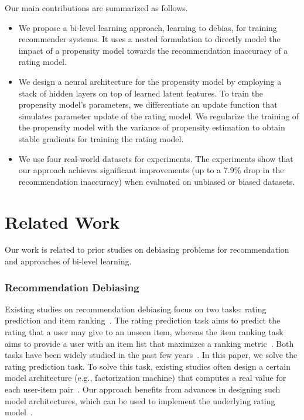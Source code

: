 \documentclass[letterpaper]{article} %
\begin{document}
Our main contributions are summarized as follows.
\begin{itemize}[topsep=0pt,leftmargin=*,noitemsep,wide=0pt]
\item
We propose a bi-level learning approach, learning to debias, for training recommender systems.
It uses a nested formulation to directly model the impact of a propensity model towards the recommendation inaccuracy of a rating model.
\item
We design a neural architecture for the propensity model by employing a stack of hidden layers on top of learned latent features.
To train the propensity model's parameters, we differentiate an update function that simulates parameter update of the rating model.
We regularize the training of the propensity model with the variance of propensity estimation to obtain stable gradients for training the rating model.
\item
We use four real-world datasets for experiments.
The experiments show that our approach achieves significant improvements (up to a 7.9\% drop in the recommendation inaccuracy) when evaluated on unbiased or biased datasets.
\end{itemize}

\section{Related Work}
Our work is related to prior studies on debiasing problems for recommendation and approaches of bi-level learning.

\subsubsection{Recommendation Debiasing}
Existing studies on recommendation debiasing focus on two tasks: rating prediction and item ranking~\cite{steck2013evaluation}.
The rating prediction task aims to predict the rating that a user may give to an unseen item, whereas the item ranking task aims to provide a user with an item list that maximizes a ranking metric~\cite{steck2010training}.
Both tasks have been widely studied in the past few years~\cite{wang2018confidence}.
In this paper, we solve the rating prediction task.
To solve this task, existing studies often design a certain model architecture (e.g., factorization machine) that computes a real value for each user-item pair~\cite{tay2019holographic}.
Our approach benefits from advances in designing such model architectures, which can be used to implement the underlying rating model~\cite{he2017neural}.
\end{document}
